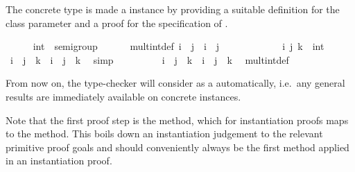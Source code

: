 \begin{isabellebody}
{}
\isamarkuptrue%
%
\begin{isamarkuptext}%
The concrete type  is made a 
  instance by providing a suitable definition for the class parameter
   and a proof for the specification of .%
\end{isamarkuptext}%
\isamarkuptrue%
\ \ \ \ \isamarkupfalse%
\ int\ {\isacharcolon}{\isacharcolon}\ semigroup\isanewline
\ \ \ \ \ \ mult{\isacharunderscore}int{\isacharunderscore}def{\isacharcolon}\ {\isachardoublequoteopen}i\ {\isasymotimes}\ j\ {\isasymequiv}\ i\ {\isacharplus}\ j{\isachardoublequoteclose}\isanewline
%
\isadelimproof
\ \ \ \ %
\endisadelimproof
%
\isatagproof
{}\isamarkupfalse%
\isanewline
\ \ \ \ \ \ \isamarkupfalse%
\ i\ j\ k\ {\isacharcolon}{\isacharcolon}\ int\ \isamarkupfalse%
\ {\isachardoublequoteopen}{\isacharparenleft}i\ {\isacharplus}\ j{\isacharparenright}\ {\isacharplus}\ k\ {\isacharequal}\ i\ {\isacharplus}\ {\isacharparenleft}j\ {\isacharplus}\ k{\isacharparenright}{\isachardoublequoteclose}\ \isamarkupfalse%
\ simp\isanewline
\ \ \ \ \ \ \isamarkupfalse%
\ \isamarkupfalse%
\ {\isachardoublequoteopen}{\isacharparenleft}i\ {\isasymotimes}\ j{\isacharparenright}\ {\isasymotimes}\ k\ {\isacharequal}\ i\ {\isasymotimes}\ {\isacharparenleft}j\ {\isasymotimes}\ k{\isacharparenright}{\isachardoublequoteclose}\ \isamarkupfalse%
\ mult{\isacharunderscore}int{\isacharunderscore}def\ \isacommand{{\isachardot}}\isamarkupfalse%
\isanewline
\ \ \ \ \isamarkupfalse%
%
\endisatagproof
{\isafoldproof}%
%
\isadelimproof
%
\endisadelimproof
%
\begin{isamarkuptext}%
\noindent From now on, the type-checker will consider 
  as a  automatically, i.e.\ any general results
  are immediately available on concrete instances.

  Note that the first proof step is the  method,
  which for instantiation proofs maps to the  method.
  This boils down an instantiation judgement to the relevant primitive
  proof goals and should conveniently always be the first method applied
  in an instantiation proof.


\end{isamarkuptext}
\end{isabellebody}
